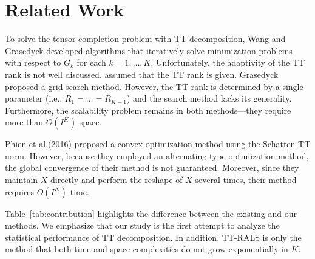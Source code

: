 \section{Related Work}

To solve the tensor completion problem with TT decomposition,
Wang \etal \cite{wang2016tensor} and Grasedyck \etal \cite{grasedyck2015alternating} developed
algorithms that iteratively solve minimization problems with respect
to $G_k$ for each $k = 1,\ldots,K$. Unfortunately, the adaptivity of
the TT rank is not well discussed.  \cite{wang2016tensor} assumed that
the TT rank is given. Grasedyck \etal \cite{grasedyck2015alternating} proposed a grid
search method. However, the TT rank is determined by a single
parameter (i.e., $R_1=\dots=R_{K-1}$) and the search method lacks its
generality.  Furthermore, the scalability problem remains in both
methods---they require more than $O(I^K)$ space.

Phien et al.(2016) \cite{phien2016efficient} proposed a convex
optimization method using the Schatten TT norm.  However, because they
employed an alternating-type optimization method, the global
convergence of their method is not guaranteed. Moreover, since they
maintain $X$ directly and perform the reshape of $X$ several times,
their method requires $O(I^K)$ time.

%

Table~\ref{tab:contribution} highlights the difference between the
existing and our methods. We emphasize that our study is the first
attempt to analyze the statistical performance of TT decomposition. In
addition, TT-RALS is only the method that both time and space
complexities do not grow exponentially in $K$.

